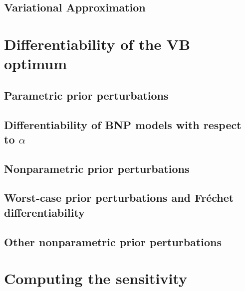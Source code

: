 \documentclass[ba]{imsart}
\begin{document}
    \subsection{Variational Approximation}
    



\section{Differentiability of the VB optimum}


    \subsection{Parametric prior perturbations}
    

    \subsection{Differentiability of BNP models with respect to $\alpha$}
    

    \subsection{Nonparametric prior perturbations}
    

    \subsection{Worst-case prior perturbations and Fr{\'e}chet differentiability}
    

    \subsection{Other nonparametric prior perturbations}
    

\section{Computing the sensitivity}

\end{document}
